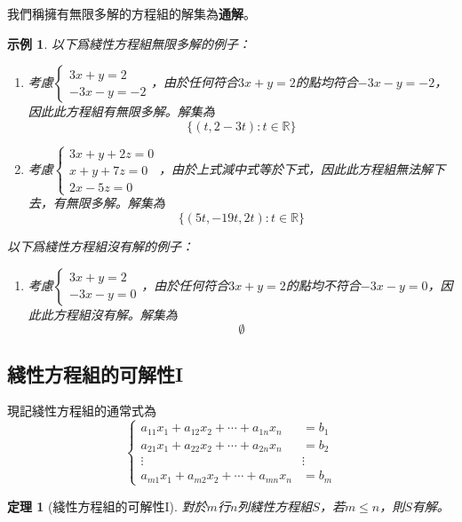 \documentclass[12pt]{article}
\newtheorem*{theorem}{定理}
\newtheorem*{example}{示例}
\begin{document}
    我們稱擁有無限多解的方程組的解集為\textbf{通解}。

    \begin{example}

        以下爲綫性方程組無限多解的例子：
        \begin{enumerate}
            \item 考慮$\begin{cases}
                3x+y=2\\-3x-y=-2
            \end{cases}$，由於任何符合$3x+y=2$的點均符合$-3x-y=-2$，因此此方程組有無限多解。解集為$$\{(t,2-3t):t\in\mathbb{R}\}$$
            \item 考慮$\begin{cases}
                3x+y+2z=0\\x+y+7z=0\\2x-5z=0
            \end{cases}$，由於上式減中式等於下式，因此此方程組無法解下去，有無限多解。解集為$$\{(5t,-19t,2t):t\in\mathbb{R}\}$$
        \end{enumerate}

        
        以下爲綫性方程組沒有解的例子：\begin{enumerate}
            \item 考慮$\begin{cases}
                3x+y=2\\-3x-y=0
            \end{cases}$，由於任何符合$3x+y=2$的點均不符合$-3x-y=0$，因此此方程組沒有解。解集為$$\emptyset$$
        \end{enumerate}
    \end{example}

    \subsection*{綫性方程組的可解性I}

    現記綫性方程組的通常式為
    $$\begin{cases}
        a_{11}x_1+a_{12}x_2+\cdots+a_{1n}x_{n}&=b_1\\
        a_{21}x_1+a_{22}x_2+\cdots+a_{2n}x_{n}&=b_2\\
        \vdots&\vdots\\
        a_{m1}x_1+a_{m2}x_2+\cdots+a_{mn}x_{n}&=b_m
    \end{cases}$$
    
    \begin{theorem}[綫性方程組的可解性I]
        對於$m$行$n$列綫性方程組$S$，若$m\leq n$，則$S$有解。
    \end{theorem}
    
\end{document}
